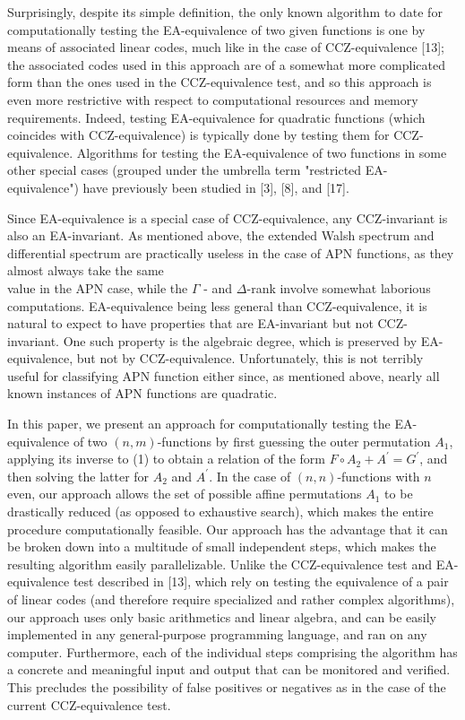 \documentclass[10pt]{article}
\begin{document}
Surprisingly, despite its simple definition, the only known algorithm to date for computationally testing the EA-equivalence of two given functions is one by means of associated linear codes, much like in the case of CCZ-equivalence [13]; the associated codes used in this approach are of a somewhat more complicated form than the ones used in the CCZ-equivalence test, and so this approach is even more restrictive with respect to computational resources and memory requirements. Indeed, testing EA-equivalence for quadratic functions (which coincides with CCZ-equivalence) is typically done by testing them for CCZ-equivalence. Algorithms for testing the EA-equivalence of two functions in some other special cases (grouped under the umbrella term "restricted EA-equivalence") have previously been studied in [3], [8], and [17].

Since EA-equivalence is a special case of CCZ-equivalence, any CCZ-invariant is also an EA-invariant. As mentioned above, the extended Walsh spectrum and differential spectrum are practically useless in the case of APN functions, as they almost always take the same\\
value in the APN case, while the $\Gamma$ - and $\Delta$-rank involve somewhat laborious computations. EA-equivalence being less general than CCZ-equivalence, it is natural to expect to have properties that are EA-invariant but not CCZ-invariant. One such property is the algebraic degree, which is preserved by EA-equivalence, but not by CCZ-equivalence. Unfortunately, this is not terribly useful for classifying APN function either since, as mentioned above, nearly all known instances of APN functions are quadratic.

In this paper, we present an approach for computationally testing the EA-equivalence of two $(n, m)$-functions by first guessing the outer permutation $A_{1}$, applying its inverse to (1) to obtain a relation of the form $F \circ A_{2}+A^{\prime}=G^{\prime}$, and then solving the latter for $A_{2}$ and $A^{\prime}$. In the case of $(n, n)$-functions with $n$ even, our approach allows the set of possible affine permutations $A_{1}$ to be drastically reduced (as opposed to exhaustive search), which makes the entire procedure computationally feasible. Our approach has the advantage that it can be broken down into a multitude of small independent steps, which makes the resulting algorithm easily parallelizable. Unlike the CCZ-equivalence test and EA-equivalence test described in [13], which rely on testing the equivalence of a pair of linear codes (and therefore require specialized and rather complex algorithms), our approach uses only basic arithmetics and linear algebra, and can be easily implemented in any general-purpose programming language, and ran on any computer. Furthermore, each of the individual steps comprising the algorithm has a concrete and meaningful input and output that can be monitored and verified. This precludes the possibility of false positives or negatives as in the case of the current CCZ-equivalence test.
\end{document}
